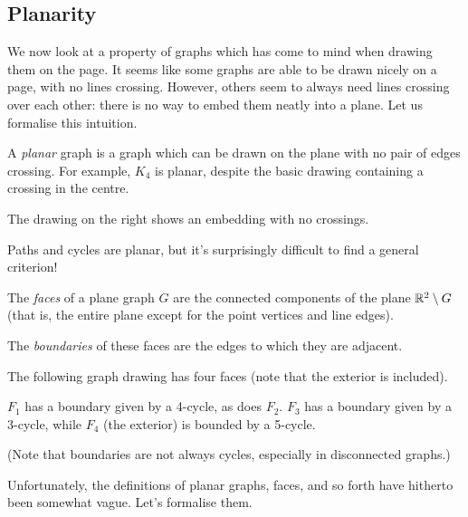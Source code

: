 \documentclass{article}
\begin{document}

\subsection{Planarity}

We now look at a property of graphs which has come to mind when drawing them on the page. It seems like some graphs are able to be drawn nicely on a page, with no lines crossing. However, others seem to always need lines crossing over each other: there is no way to embed them neatly into a plane. Let us formalise this intuition.

\begin{definition}
	A \textit{planar} graph is a graph which can be drawn on the plane with no pair of edges crossing. For example, $K_4$ is planar, despite the basic drawing containing a crossing in the centre.
	
	
	The drawing on the right shows an embedding with no crossings.
\end{definition}

Paths and cycles are planar, but it's surprisingly difficult to find a general criterion!

\begin{definition}[Face]
    The \textit{faces} of a plane graph $G$ are the connected components of the plane $\mathbb{R}^2 \setminus G$ (that is, the entire plane except for the point vertices and line edges).
    
    The \textit{boundaries} of these faces are the edges to which they are adjacent.
\end{definition}

\begin{example}[Faces]
    The following graph drawing has four faces (note that the exterior is included).
    
    
    $F_1$ has a boundary given by a 4-cycle, as does $F_2$. $F_3$ has a boundary given by a 3-cycle, while $F_4$ (the exterior) is bounded by a 5-cycle.
    
    (Note that boundaries are not always cycles, especially in disconnected graphs.)
\end{example}

Unfortunately, the definitions of planar graphs, faces, and so forth have hitherto been somewhat vague. Let's formalise them.
\end{document}
